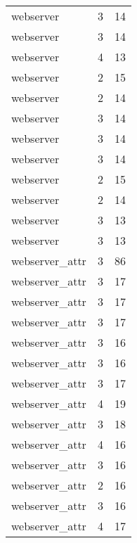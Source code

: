 \begin{table}
\begin{tabular}{lrr}
                       webserver &         3 &        14 \\
                       webserver &         3 &        14 \\
                       webserver &         4 &        13 \\
                       webserver &         2 &        15 \\
                       webserver &         2 &        14 \\
                       webserver &         3 &        14 \\
                       webserver &         3 &        14 \\
                       webserver &         3 &        14 \\
                       webserver &         2 &        15 \\
                       webserver &         2 &        14 \\
                       webserver &         3 &        13 \\
                       webserver &         3 &        13 \\
                  webserver\_attr &         3 &        86 \\
                  webserver\_attr &         3 &        17 \\
                  webserver\_attr &         3 &        17 \\
                  webserver\_attr &         3 &        17 \\
                  webserver\_attr &         3 &        16 \\
                  webserver\_attr &         3 &        16 \\
                  webserver\_attr &         3 &        17 \\
                  webserver\_attr &         4 &        19 \\
                  webserver\_attr &         3 &        18 \\
                  webserver\_attr &         4 &        16 \\
                  webserver\_attr &         3 &        16 \\
                  webserver\_attr &         2 &        16 \\
                  webserver\_attr &         3 &        16 \\
                  webserver\_attr &         4 &        17 \\

\end{tabular}
\end{table}
